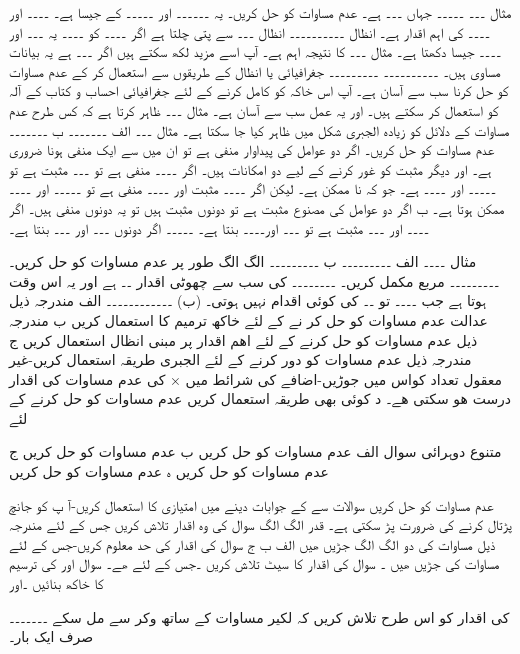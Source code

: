 مثال ۔۔۔
۔۔۔۔۔ جہاں ۔۔۔ ہے۔ عدم مساوات کو حل کریں۔ یہ ۔۔۔۔۔۔ اور ۔۔۔۔۔ کے جیسا ہے۔ ۔۔۔۔ اور ۔۔۔۔ کی اہم اقدار ہے۔
انظال
۔۔۔۔۔۔۔۔۔۔
انظال ۔۔۔ سے پتی چلتا ہے اگر ۔۔۔۔ کو ۔۔۔۔ یہ ۔۔۔ اور ۔۔۔۔ جیسا دکھتا ہے۔
مثال ۔۔۔ کا نتیجہ اہم ہے۔ آپ اسے مزید لکھ سکتے ہیں اگر ۔۔۔ ہے یہ بیانات مساوی ہیں۔
۔۔۔۔۔۔۔۔۔۔  ۔۔۔۔۔۔۔۔۔
جغرافیائی یا انظال کے طریقوں سے استعمال کر کے عدم مساوات کو حل کرنا سب سے آسان ہے۔ آپ اس خاکہ کو کامل کرنے کے لئے جغرافیائی احساب و کتاب کے آلہ کو استعمال کر سکتے ہیں۔ اور یہ عمل سب سے آسان ہے۔
مثال ۔۔۔ ظاہر کرتا ہے کہ کس طرح عدم مساوات کے دلائل کو زیادہ الجبری شکل میں ظاہر کیا جا سکتا ہے۔ 
مثال ۔۔۔
الف ۔۔۔۔۔۔۔
ب ۔۔۔۔۔۔۔
عدم مساوات کو حل کریں۔
اگر دو عوامل کی پیداوار منفی ہے تو ان میں سے ایک منفی ہونا ضروری ہے۔ اور دیگر مثبت کو غور کرنے کے لیے دو امکانات ہیں۔
اگر ۔۔۔۔ منفی ہے تو ۔۔۔ مثبت ہے تو ۔۔۔۔۔ اور ۔۔۔۔ ہے۔ جو کہ نا ممکن ہے۔ لیکن اگر ۔۔۔۔ مثبت اور ۔۔۔۔ منفی ہے تو ۔۔۔۔۔ اور ۔۔۔۔ ممکن ہوتا ہے۔
ب اگر دو عوامل کی مصنوع مثبت ہے تو دونوں مثبت ہیں تو یہ دونوں منفی ہیں۔
اگر ۔۔۔۔ اور ۔۔۔ مثبت ہے تو ۔۔۔ اور۔۔۔۔ بنتا ہے۔ ۔۔۔۔۔ اگر دونوں ۔۔۔ اور ۔۔۔ بنتا ہے۔

مثال ۔۔۔۔
الف ۔۔۔۔۔۔۔۔۔
ب ۔۔۔۔۔۔۔۔۔
الگ الگ طور پر عدم مساوات کو حل کریں۔
۔۔۔۔۔۔۔۔۔ مربع مکمل کریں۔
۔۔۔۔۔۔۔۔ کی سب سے چھوٹی اقدار ۔۔ ہے اور یہ اس وقت ہوتا ہے جب ۔۔۔۔  تو ۔۔ کی کوئی اقدام نہیں ہوتی۔
(ب)  ۔۔۔۔۔۔۔۔۔۔۔۔
الف  مندرجہ ذیل عدالت عدم مساوات کو حل  کر نے کے لئے خاکھ ترمیم کا استعمال کریں 
ب مندرجہ ذیل عدم مساوات کو حل کرنے کے لئے اھم اقدار پر مبنی انظال استعمال کریں  
  ج  مندرجہ ذیل عدم مساوات کو دور کرنے کے لئے الجبری طریقہ استعمال کریں-غیر معقول تعداد کواس میں جوڑیں-اضافے کی شرائط میں × کی عدم مساوات کی اقدار درست ھو سکتی ھے۔ 
د  کوئی بھی طریقہ استعمال کریں عدم مساوات کو حل کرنے کے لئے 

متنوع دوہرائی                    
سوال 
الف   عدم مساوات کو حل کریں 
ب         عدم مساوات کو حل کریں       
ج  عدم مساوات کو حل کریں    
ہ  عدم مساوات کو حل کریں 


عدم مساوات کو حل کریں 
سوالات   سے  کے جوابات دینے میں امتیازی   کا استعمال کریں-آ پ کو جانچ پڑتال کرنے کی ضرورت پڑ سکتی ہے۔ قدر  الگ الگ 
سوال    کی وہ اقدار تلاش کریں جس کے لئے مندرجہ ذیل مساوات کی دو الگ الگ جڑیں ھیں 
الف   ب    ج 
سوال     کی اقدار کی حد معلوم کریں-جس کے لئے       مساوات کی جڑیں ھیں ۔
سوال     کی اقدار کا سیٹ تلاش کریں ۔جس کے لئے       ھے۔
سوال        اور      کی ترسیم کا خاکھ بنائیں ۔اور                              

کی اقدار کو اس طرح تلاش کریں کہ لکیر مساوات کے ساتھ وکر سے مل سکے ۔۔۔۔۔۔۔صرف ایک بار۔

